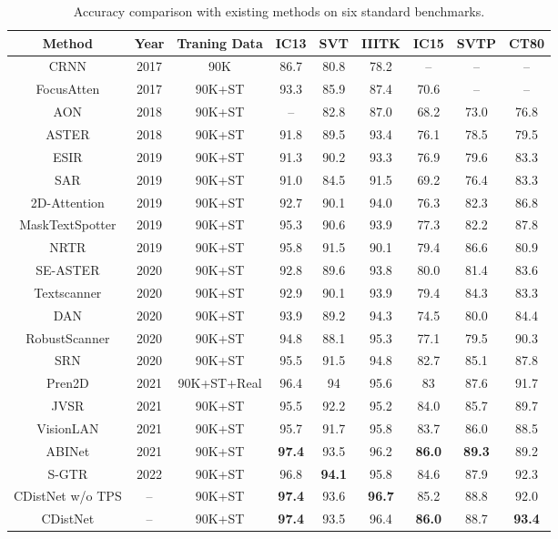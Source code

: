 \begin{table*}[th]
\centering
\caption{Accuracy comparison with existing methods on six standard benchmarks.}
\begin{tabular}{|c|c|c|c|c|c|c|c|c|}
\hline
Method&Year&Traning Data&IC13&SVT&IIITK&IC15&SVTP&CT80\\
\hline
CRNN\citep{ShiBY17crnn} & 2017 & 90K  & 86.7 & 80.8 & 78.2 & -- & --& --  \\
FocusAtten\citep{cheng2017focusing_attention}& 2017 & 90K+ST & 93.3 & 85.9 & 87.4 & 70.6 & -- & --\\
AON\citep{cheng2018aon}& 2018 & 90K+ST  & -- & 82.8 & 87.0 & 68.2 &73.0 & 76.8\\
ASTER\citep{shi2018aster}& 2018 & 90K+ST  & 91.8& 89.5 & 93.4 & 76.1 & 78.5 & 79.5\\
ESIR\citep{zhan2019esir}& 2019 & 90K+ST  & 91.3 & 90.2 & 93.3 & 76.9 & 79.6 & 83.3 \\
SAR\citep{li2019sar}& 2019 & 90K+ST & 91.0 & 84.5 & 91.5 & 69.2 & 76.4 & 83.3\\
2D-Attention\citep{2dattentionlyu20192d} & 2019 & 90K+ST& 92.7 & 90.1 & 94.0 & 76.3 & 82.3 & 86.8 \\
MaskTextSpotter\citep{liao2019mask} & 2019 & 90K+ST & 95.3 & 90.6 & 93.9 & 77.3 & 82.2 & 87.8 \\
NRTR\citep{sheng2019nrtr} & 2019 & 90K+ST & 95.8 & 91.5 & 90.1 & 79.4 & 86.6 & 80.9\\
SE-ASTER \citep{SEEDqiao2020seed} & 2020 & 90K+ST  & 92.8 & 89.6 & 93.8 & 80.0 & 81.4 & 83.6 \\
Textscanner\citep{wan2020textscanner} & 2020 & 90K+ST & 92.9 & 90.1 & 93.9 & 79.4 & 84.3 & 83.3\\
DAN\citep{wang2020DAN} & 2020 & 90K+ST  & 93.9 & 89.2 & 94.3 & 74.5 & 80.0 & 84.4 \\
RobustScanner\citep{yue2020robustscanner} & 2020 & 90K+ST  & 94.8 & 88.1 & 95.3 & 77.1 & 79.5 & 90.3\\
SRN\citep{SRNyu2020towards} & 2020 & 90K+ST & 95.5 & 91.5 & 94.8 & 82.7 & 85.1 & 87.8\\
Pren2D\citep{yan2021primitive} & 2021 & 90K+ST+Real & 96.4& 94& 95.6& 83 & 87.6& 91.7\\
JVSR\citep{bhunia2021jvsr} & 2021 & 90K+ST & 95.5 & 92.2 & 95.2 & 84.0 & 85.7 & 89.7 \\
VisionLAN\citep{wang2021FTO}& 2021 & 90K+ST  & 95.7& 91.7& 95.8 & 83.7 & 86.0 & 88.5\\
ABINet\citep{ABInet21CVPR} & 2021 & 90K+ST & \textbf{97.4} &93.5& 96.2&\textbf{86.0}&\textbf{89.3}&89.2\\

S-GTR\citep{he2021S-GTR} & 2022 & 90K+ST  & 96.8	& \textbf{94.1}	& 95.8	& 84.6	& 87.9 &	92.3
\\
\hline
CDistNet w/o TPS & -- & 90K+ST  & \textbf{97.4} & 93.6 & \textbf{96.7} & 85.2 & 88.8 & 92.0\\
CDistNet & -- & 90K+ST  & \textbf{97.4} & 93.5 & 96.4 & \textbf{86.0} & 88.7 & \textbf{93.4}\\
\hline
\end{tabular}
\label{table:sota2}
\end{table*}

